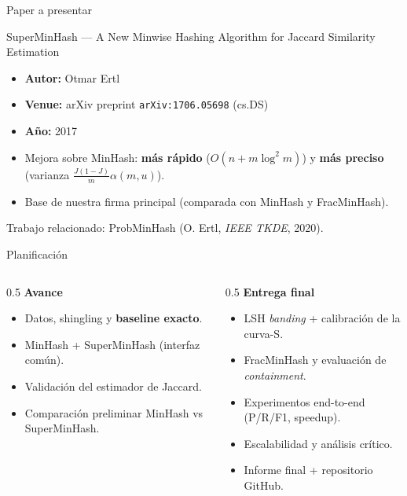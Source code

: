 \documentclass[aspectratio=169,11pt]{beamer}
\begin{document}
\begin{frame}{Paper a presentar}
  \begin{block}{SuperMinHash --- A New Minwise Hashing Algorithm for Jaccard Similarity Estimation}
    \begin{itemize}
      \item \textbf{Autor:} Otmar Ertl
      \item \textbf{Venue:} arXiv preprint \texttt{arXiv:1706.05698} (cs.DS)
      \item \textbf{Año:} 2017
    \end{itemize}
  \end{block}
  \begin{itemize}
    \item Mejora sobre MinHash: \textbf{más rápido} ($O(n+m\log^2 m)$) y
          \textbf{más preciso} (varianza $\tfrac{J(1-J)}{m}\alpha(m,u)$).
    \item Base de nuestra firma principal (comparada con MinHash y FracMinHash).
  \end{itemize}
  \vfill
  \footnotesize Trabajo relacionado: ProbMinHash (O. Ertl, \emph{IEEE TKDE}, 2020).
\end{frame}

\begin{frame}{Planificación}
  \begin{columns}[T]
    \begin{column}{0.5\textwidth}
      \textbf{Avance}
      \begin{itemize}
        \item Datos, shingling y \textbf{baseline exacto}.
        \item MinHash + SuperMinHash (interfaz común).
        \item Validación del estimador de Jaccard.
        \item Comparación preliminar MinHash vs SuperMinHash.
      \end{itemize}
    \end{column}
    \begin{column}{0.5\textwidth}
      \textbf{Entrega final}
      \begin{itemize}
        \item LSH \emph{banding} + calibración de la curva-S.
        \item FracMinHash y evaluación de \emph{containment}.
        \item Experimentos end-to-end (P/R/F1, speedup).
        \item Escalabilidad y análisis crítico.
        \item Informe final + repositorio GitHub.
      \end{itemize}
    \end{column}
  \end{columns}
\end{frame}
\end{document}
